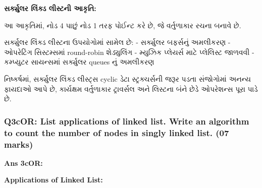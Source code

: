 \textbf{સર્ક્યુલર લિંક્ડ લીસ્ટની આકૃતિ:}

\begin{Shaded}
\begin{Highlighting}[]
\end{Highlighting}
\end{Shaded}

આ આકૃતિમાં, નોડ 4 પાછું નોડ 1 તરફ પોઈન્ટ કરે છે, જે વર્તુળાકાર રચના બનાવે છે.

સર્ક્યુલર લિંક્ડ લીસ્ટના ઉપયોગોમાં સામેલ છે: - સર્ક્યુલર બફર્સનું અમલીકરણ - ઓપરેટિંગ
સિસ્ટમ્સમાં round-robin શેડ્યુલિંગ - મ્યુઝિક પ્લેયર્સ માટે પ્લેલિસ્ટ જાળવવી - કમ્પ્યુટર
સાયન્સમાં સર્ક્યુલર queues નું અમલીકરણ

નિષ્કર્ષમાં, સર્ક્યુલર લિંક્ડ લીસ્ટ્સ cyclic ડેટા સ્ટ્રક્ચર્સની જરૂર પડતા સંજોગોમાં અનન્ય
ફાયદાઓ આપે છે, કાર્યક્ષમ વર્તુળાકાર ટ્રાવર્સલ અને લિસ્ટના બંને છેડે ઓપરેશન્સ પૂરા પાડે છે.

\hypertarget{q3cor-list-applications-of-linked-list.-write-an-algorithm-to-count-the-number-of-nodes-in-singly-linked-list.-07-marks}{%
\subsubsection{Q3cOR: List applications of linked list. Write an
algorithm to count the number of nodes in singly linked list. (07
marks)}\label{q3cor-list-applications-of-linked-list.-write-an-algorithm-to-count-the-number-of-nodes-in-singly-linked-list.-07-marks}}

\textbf{Ans 3cOR:}

\textbf{Applications of Linked List:}

